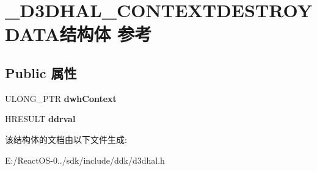 \hypertarget{struct___d3_d_h_a_l___c_o_n_t_e_x_t_d_e_s_t_r_o_y_d_a_t_a}{}\section{\+\_\+\+D3\+D\+H\+A\+L\+\_\+\+C\+O\+N\+T\+E\+X\+T\+D\+E\+S\+T\+R\+O\+Y\+D\+A\+T\+A结构体 参考}
\label{struct___d3_d_h_a_l___c_o_n_t_e_x_t_d_e_s_t_r_o_y_d_a_t_a}
\subsection*{Public 属性}
\begin{DoxyCompactItemize}
\item 
\mbox{\label{struct___d3_d_h_a_l___c_o_n_t_e_x_t_d_e_s_t_r_o_y_d_a_t_a_aede86a8bffd384ab196a86a03352336f}} 
U\+L\+O\+N\+G\+\_\+\+P\+TR {\bfseries dwh\+Context}
\item 
\mbox{\label{struct___d3_d_h_a_l___c_o_n_t_e_x_t_d_e_s_t_r_o_y_d_a_t_a_a497418379ec4e828846d2c5ccbe96695}} 
H\+R\+E\+S\+U\+LT {\bfseries ddrval}
\end{DoxyCompactItemize}


该结构体的文档由以下文件生成\+:\begin{DoxyCompactItemize}
\item 
E\+:/\+React\+O\+S-\/0../sdk/include/ddk/d3dhal.\+h\end{DoxyCompactItemize}
